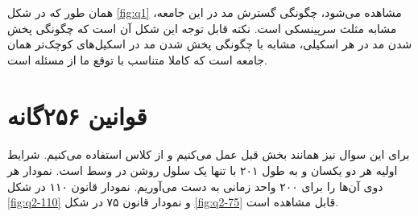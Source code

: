 \documentclass[11pt, a4paper]{article}
\begin{document}
همان طور که در شکل \ref{fig:q1} مشاهده می‌شود، چگونگی گسترش مد در این جامعه، مشابه مثلث سرپینسکی است. نکته قابل توجه این شکل آن است که چگونگی پخش شدن مد در هر اسکیلی، مشابه با چگونگی پخش شدن مد در اسکیل‌های کوچک‌تر همان جامعه است که کاملا متناسب با توقع ما از مسئله است.



\section{\textbf{قوانین ۲۵۶گانه}}
\paragraph{}
برای این سوال نیز همانند بخش قبل عمل می‌کنیم و از کلاس  استفاده می‌کنیم. شرایط اولیه هر دو یکسان و به طول ۲۰۱ با تنها یک سلول روشن در وسط است. نمودار هر دو‌ی آن‌ها را برای ۲۰۰ واحد زمانی به دست می‌آوریم. نمودار قانون ۱۱۰ در شکل \ref{fig:q2-110} و نمودار قانون ۷۵ در شکل \ref{fig:q2-75} قابل مشاهده است.
\end{document}
